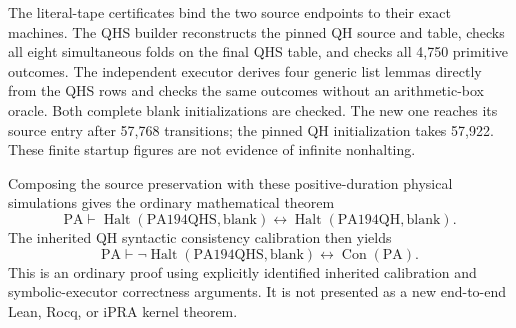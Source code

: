 The literal-tape certificates bind the two source endpoints to their exact
machines. The QHS builder reconstructs the pinned QH source and table,
checks all eight simultaneous folds on the final QHS table, and checks
all 4,750 primitive outcomes. The independent executor derives four generic
list lemmas directly from the QHS rows and checks the same outcomes without
an arithmetic-box oracle. Both complete blank initializations are checked.
The new one reaches its source entry after 57,768 transitions; the pinned
QH initialization takes 57,922. These finite startup figures are not evidence
of infinite nonhalting.

Composing the source preservation with these positive-duration physical
simulations gives the ordinary mathematical theorem
\[
 \mathrm{PA}\vdash
 \operatorname{Halt}(\mathrm{PA194QHS},\mathrm{blank})
 \leftrightarrow
 \operatorname{Halt}(\mathrm{PA194QH},\mathrm{blank}).
\]
The inherited QH syntactic consistency calibration then yields
\[
 \mathrm{PA}\vdash
 \neg\operatorname{Halt}(\mathrm{PA194QHS},\mathrm{blank})
 \leftrightarrow \operatorname{Con}(\mathrm{PA}).
\]
This is an ordinary proof using explicitly identified inherited calibration
and symbolic-executor correctness arguments. It is not presented as a new
end-to-end Lean, Rocq, or iPRA kernel theorem.
